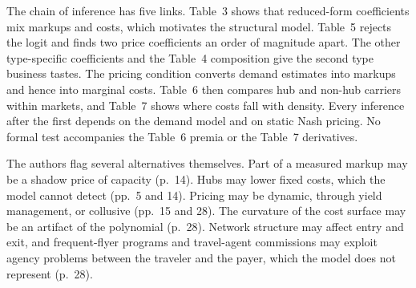 The chain of inference has five links. Table~3 shows that reduced-form coefficients mix markups and costs,
which motivates the structural model. Table~5 rejects the logit and finds two price coefficients an order of
magnitude apart. The other type-specific coefficients and the Table~4 composition give the second type
business tastes. The pricing condition converts demand estimates into markups and hence into marginal costs.
Table~6 then compares hub and non-hub carriers within markets, and Table~7 shows where costs fall with
density. Every inference after the first depends on the demand model and on static Nash pricing. No formal
test accompanies the Table~6 premia or the Table~7 derivatives.

The authors flag several alternatives themselves. Part of a measured markup may be a shadow price of capacity
(p.~14). Hubs may lower fixed costs, which the model cannot detect (pp.~5 and 14). Pricing may be dynamic,
through yield management, or collusive (pp.~15 and 28). The curvature of the cost surface may be an artifact of the
polynomial (p.~28). Network structure may affect entry and exit, and frequent-flyer programs and travel-agent
commissions may exploit agency problems between the traveler and the payer, which the model does not
represent (p.~28).

